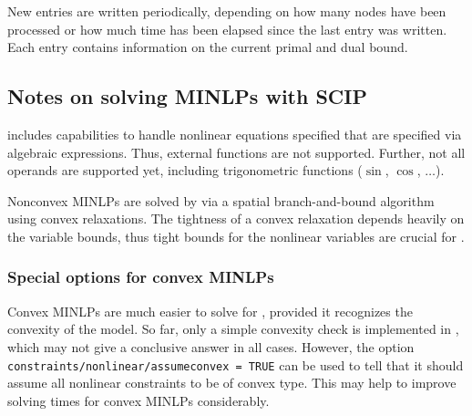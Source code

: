 New entries are written periodically, depending on how many nodes have been processed or how much time has been elapsed since the last entry was written. Each entry contains information on the current primal and dual bound.


\subsection{Notes on solving MINLPs with SCIP}

\SCIP includes capabilities to handle nonlinear equations specified that are specified via algebraic expressions.
Thus, external functions are not supported. Further, not all \GAMS operands are supported yet, including trigonometric functions ($\sin$, $\cos$, $\ldots$).


Nonconvex MINLPs are solved by \SCIP via a spatial branch-and-bound algorithm using convex relaxations.
The tightness of a convex relaxation depends heavily on the variable bounds, thus tight bounds for the nonlinear variables are crucial for \SCIP.

\subsubsection{Special options for convex MINLPs}

Convex MINLPs are much easier to solve for \SCIP, provided it recognizes the convexity of the model. So far, only a simple convexity check is implemented in \SCIP, which may not give a conclusive answer in all cases.
However, the option \texttt{constraints/nonlinear/assumeconvex = TRUE} can be used to tell \SCIP that it should assume all nonlinear constraints to be of convex type. This may help to improve solving times for convex MINLPs considerably.

